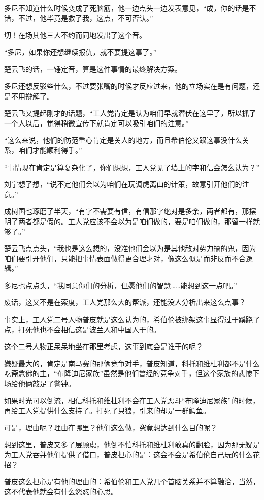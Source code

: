 多尼不知道什么时候变成了死脑筋，他一边点头一边发表意见，“成，你的话是不错，不过，他毕竟是救了我，这点，不可否认。”

切！在场其他三人不约而同地发出了这个音。

“多尼，如果你还想继续报仇，就不要提这事了。”

楚云飞的话，一锤定音，算是这件事情的最终解决方案。

多尼还想反驳些什么，不过要张嘴的时候才反应过来，他的立场实在是有问题，还是不用辩解了。

楚云飞又提起刚才的话题，“工人党肯定是认为咱们早就潜伏在这里了，所以抓了一个人以后，觉得稍微宣传下就肯定可以吸引咱们的注意。”

“这么来说，他们的防范重心肯定是关人的地方，而且希伯伦又跟这事没什么关系，咱们才能顺利得手。”

“事情现在肯定是算复杂化了，你们想想，工人党见了墙上的字和信会怎么认为？”

刘宁想了想，“说不定他们会以为咱们在玩调虎离山的计策，故意引开他们的注意。”

成树国也琢磨了半天，“有字不需要有信，有信那字绝对是多余，两者都有，那摆明了两者都是假的。工人党应该不会以为是咱们做的，要是咱们做的，那留一样就够了。”

楚云飞点点头，“我也是这么想的，没准他们会以为是其他敌对势力搞的鬼，因为咱们要引开他们，只能把事情表面做得更合理才对，像这么似是而非反而不合逻辑。”

多尼也点点头，“我同意你们的分析，但愿他们的智慧……能想到这一点吧。”

废话，这又不是在索度，工人党那么大的帮派，还能没人分析出来这么点事？

事实上，工人党二号人物普皮就是这么认为的，希伯伦被绑架这事显得过于蹊跷了点，打死他也不会相信这是波兰人和中国人干的。

这个二号人物正呆呆地坐在那里考虑，这事到底会是谁干的呢？

嫌疑最大的，肯定是南马赛的那俩竞争对手，普皮知道，科托和维杜利都不是什么吃斋念佛的主，“布隆迪尼家族”虽然是他们曾经的竞争对手，但这个家族的悲惨下场给他俩敲足了警钟。

如果时光可以倒流，相信科托和维杜利不会在工人党恶斗“布隆迪尼家族”的时候，再给工人党提供什么支持了。打死了只狼，引来的却是一群鳄鱼。

可是，理由呢？理由在哪里？他们这么做，究竟想达到什么目的呢？

想到这里，普皮又多了层顾虑，他倒不怕科托和维杜利敢真的翻脸，因为那无疑是为工人党吞并他们提供了借口，普皮担心的是：这会不会是希伯伦自己玩的什么花招？

普皮这么担心是有他的理由的：希伯伦和工人党几个首脑关系并不算融洽，当然，这不代表他就会有什么怨怼的心思。

